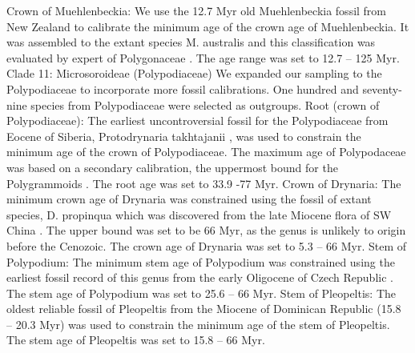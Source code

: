 \documentclass[10pt]{article}
\begin{document}
Crown of Muehlenbeckia: We use the 12.7 Myr old Muehlenbeckia fossil from New Zealand \citep{Pole 1993} to calibrate the minimum age of the crown age of Muehlenbeckia. It was assembled to the extant species M. australis \citep{Pole 1993} and this classification was evaluated by expert of Polygonaceae \citep{Schuster, Setaro et al. 2013}. The age range was set to 12.7 – 125 Myr.
Clade 11: Microsoroideae (Polypodiaceae)
We expanded our sampling to the Polypodiaceae to incorporate more fossil calibrations. One hundred and seventy-nine species from Polypodiaceae were selected as outgroups. 
Root (crown of Polypodiaceae): The earliest uncontroversial fossil for the Polypodiaceae from Eocene of Siberia, Protodrynaria takhtajanii \citep{Vikulin and Bobrov 1987}, was used to constrain the minimum age of the crown of Polypodiaceae. The maximum age of Polypodaceae was based on a secondary calibration, the uppermost bound for the Polygrammoids \citep{Schuettpelz and Pryer 2009}. The root age was set to 33.9 -77 Myr.
Crown of Drynaria: The minimum crown age of Drynaria was constrained using the fossil of extant species, D. propinqua which was discovered from the late Miocene flora of SW China \citep{Wen, Xie et al. 2013}. The upper bound was set to be 66 Myr, as the genus is unlikely to origin before the Cenozoic. The crown age of Drynaria was set to 5.3 – 66 Myr.
Stem of Polypodium: The minimum stem age of Polypodium was constrained using the earliest fossil record of this genus from the early Oligocene of Czech Republic \citep{Kvacek 2001}. The stem age of Polypodium was set to 25.6 – 66 Myr.
Stem of Pleopeltis: The oldest reliable fossil of Pleopeltis from the Miocene of Dominican Republic (15.8 – 20.3 Myr) \citep{Schneider, Schmidt et al. 2015} was used to constrain the minimum age of the stem of Pleopeltis. The stem age of Pleopeltis was set to 15.8 – 66 Myr.
\end{document}
